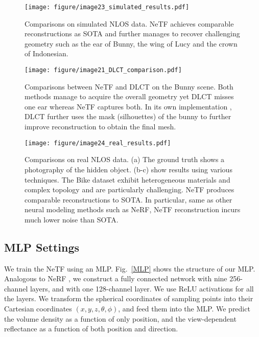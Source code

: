 \documentclass[10pt,journal,compsoc]{IEEEtran}
\begin{document}
\begin{figure*}[htbp]
\centering
\texttt{[image: figure/image23\_simulated\_results.pdf]}
\caption{Comparisons on simulated NLOS data. NeTF achieves comparable reconstructions as SOTA and further manages to recover challenging geometry such as the ear of Bunny, the wing of Lucy and the crown of Indonesian.}
\label{SimulatedResult}
\end{figure*}
 
\begin{figure*}[htbp]
\centering
\texttt{[image: figure/image21\_DLCT\_comparison.pdf]}
\caption{Comparisons between NeTF and DLCT on the Bunny scene. Both methods manage to acquire the overall geometry yet DLCT misses one ear whereas NeTF captures both. In its own implementation \cite{2020DLCT}, DLCT further uses the mask (silhouettes) of the bunny to further improve reconstruction to obtain the final mesh.  }
\label{DLCT}
\end{figure*}

\begin{figure*}[htbp]
\centering
\texttt{[image: figure/image24\_real\_results.pdf]}
\caption{Comparisons on real NLOS data. (a) The ground truth shows a photography of the hidden object. (b-c) show results using various techniques. The Bike dataset exhibit heterogeneous materials and complex topology and are particularly challenging. NeTF produces comparable reconstructions to SOTA. In particular, same as other neural modeling methods such as NeRF, NeTF reconstruction incurs much lower noise than SOTA. } 
\label{RealResult}
\end{figure*}

\subsection{MLP Settings}
We train the NeTF using an MLP. Fig.~\ref{MLP} shows the structure of our MLP. Analogous to NeRF \cite{2020NERF}, we construct a fully connected network with nine 256-channel layers, and with one 128-channel layer. We use ReLU activations for all the layers. We transform the spherical coordinates of sampling points into their Cartesian coordinates $(x,y,z,\theta,\phi)$, and feed them into the MLP. We predict the volume density as a function of only position, and the view-dependent reflectance as a function of both position and direction. 
\end{document}

